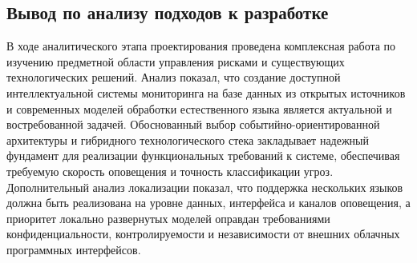 \subsection{Вывод по анализу подходов к разработке}

В ходе аналитического этапа проектирования проведена комплексная работа по изучению предметной области управления рисками и существующих технологических решений. Анализ показал, что создание доступной интеллектуальной системы мониторинга на базе данных из открытых источников и современных моделей обработки естественного языка является актуальной и востребованной задачей. Обоснованный выбор событийно-ориентированной архитектуры и гибридного технологического стека закладывает надежный фундамент для реализации функциональных требований к системе, обеспечивая требуемую скорость оповещения и точность классификации угроз. Дополнительный анализ локализации показал, что поддержка нескольких языков должна быть реализована на уровне данных, интерфейса и каналов оповещения, а приоритет локально развернутых моделей оправдан требованиями конфиденциальности, контролируемости и независимости от внешних облачных программных интерфейсов.

